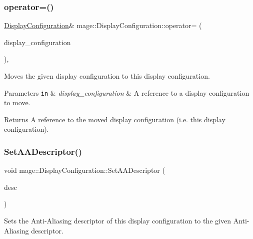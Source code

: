 \subsubsection{\texorpdfstring{operator=()}{operator=()}\hspace{0.1cm}{\footnotesize\ttfamily [2/2]}}
{\footnotesize\ttfamily \hyperlink{structmage_1_1_display_configuration}{Display\+Configuration}\& mage\+::\+Display\+Configuration\+::operator= (\begin{DoxyParamCaption}\item[{\hyperlink{structmage_1_1_display_configuration}{Display\+Configuration} \&\&}]{display\+\_\+configuration }\end{DoxyParamCaption})\hspace{0.3cm}{\ttfamily [default]}, {\ttfamily [noexcept]}}

Moves the given display configuration to this display configuration.


\begin{DoxyParams}[1]{Parameters}
\mbox{\tt in}  & {\em display\+\_\+configuration} & A reference to a display configuration to move. \\
\hline
\end{DoxyParams}
\begin{DoxyReturn}{Returns}
A reference to the moved display configuration (i.\+e. this display configuration). 
\end{DoxyReturn}
\hypertarget{structmage_1_1_display_configuration_a2fec79b21c772a3d73e44cca7d8bd9d7}{}\label{structmage_1_1_display_configuration_a2fec79b21c772a3d73e44cca7d8bd9d7} 
\subsubsection{\texorpdfstring{Set\+A\+A\+Descriptor()}{SetAADescriptor()}}
{\footnotesize\ttfamily void mage\+::\+Display\+Configuration\+::\+Set\+A\+A\+Descriptor (\begin{DoxyParamCaption}\item[{\hyperlink{namespacemage_a86cd40b8f2f42ca4d616cc6ec665a7f2}{A\+A\+Descriptor}}]{desc }\end{DoxyParamCaption})\hspace{0.3cm}{\ttfamily [noexcept]}}

Sets the Anti-\/\+Aliasing descriptor of this display configuration to the given Anti-\/\+Aliasing descriptor.


